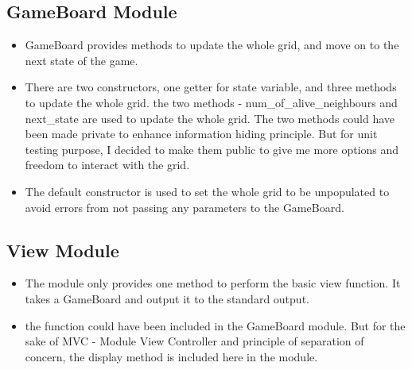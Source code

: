 \documentclass[12pt]{article}
\begin{document}
\subsection*{GameBoard Module}

\begin{itemize}
\item GameBoard provides methods to update the whole grid, and move on to the next state of the game.  

\item There are two constructors, one getter for state variable, and three methods to update the whole grid. the two methods - num\_of\_alive\_neighbours and next\_state are used to update the whole grid. The two methods could have been made private to enhance information hiding principle. But for unit testing purpose, I decided to make them public to give me more options and freedom to interact with the grid. 

\item The default constructor is used to set the whole grid to be unpopulated to avoid errors from not passing any parameters to the GameBoard. 

\end{itemize}

\subsection*{View Module}

\begin{itemize}
\item The module only provides one method to perform the basic view function.  It takes a GameBoard and output it to the standard output.  

\item the function could have been included in the GameBoard module. But for the sake of MVC - Module View Controller and principle of separation of concern, the display method is included here in the module. 

\end{itemize}
\end{document}
